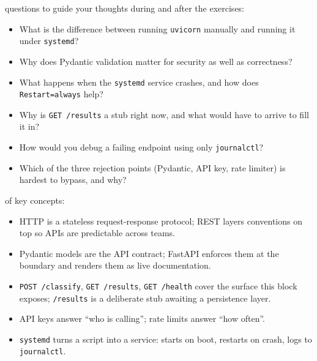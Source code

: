  questions to guide your thoughts during and after the exercises:
\begin{itemize}
    \item What is the difference between running \texttt{uvicorn} manually and running it under \texttt{systemd}?
    \item Why does Pydantic validation matter for security as well as correctness?
    \item What happens when the \texttt{systemd} service crashes, and how does \texttt{Restart=always} help?
    \item Why is \texttt{GET /results} a stub right now, and what would have to arrive to fill it in?
    \item How would you debug a failing endpoint using only \texttt{journalctl}?
    \item Which of the three rejection points (Pydantic, API key, rate limiter) is hardest to bypass, and why?
\end{itemize}

 of key concepts:
\begin{itemize}
    \item HTTP is a stateless request-response protocol; REST layers conventions on top so APIs are predictable across teams.
    \item Pydantic models are the API contract; FastAPI enforces them at the boundary and renders them as live documentation.
    \item \texttt{POST /classify}, \texttt{GET /results}, \texttt{GET /health} cover the surface this block exposes; \texttt{/results} is a deliberate stub awaiting a persistence layer.
    \item API keys answer ``who is calling''; rate limits answer ``how often''.
    \item \texttt{systemd} turns a script into a service: starts on boot, restarts on crash, logs to \texttt{journalctl}.
\end{itemize}



